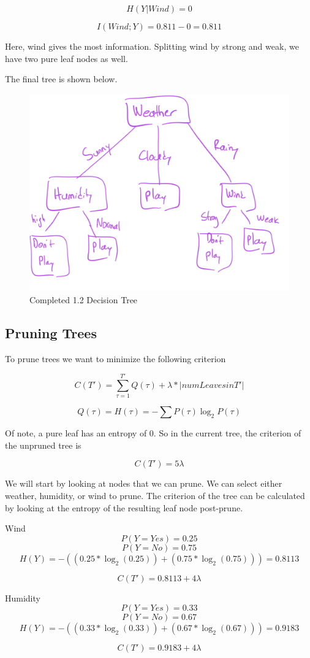 \documentclass{article}
\begin{document}
\[H(Y|Wind) = 0\]

\[I(Wind;Y) = 0.811 - 0 = 0.811\]

Here, wind gives the most information. Splitting wind by strong and weak, we have two pure leaf nodes as well.

The final tree is shown below.

\begin{figure}[H]
    \centering
    \includegraphics[width=0.5\linewidth]{1.2 Tree.png}
    \caption{Completed 1.2 Decision Tree}
\end{figure}


\subsection{Pruning Trees}

To prune trees we want to minimize the following criterion

\[C(T') = \sum_{\tau = 1}^{T'} Q(\tau) + \lambda * | num Leaves in T' |\]

\[Q(\tau) = H(\tau) = - \sum P(\tau)\log_{2}{P(\tau)}\]

Of note, a pure leaf has an entropy of 0. So in the current tree, the criterion of the unpruned tree is

\[C(T') =  5\lambda\]

We will start by looking at nodes that we can prune. We can select either weather, humidity, or wind to prune. The criterion of the tree can be calculated by looking at the entropy of the resulting leaf node post-prune. 

Wind
\[P(Y = Yes) = 0.25\]
\[ P(Y = No) = 0.75\]
\[H(Y) = - ((0.25 * \log_2(0.25)) + (0.75 * \log_2(0.75))) = 0.8113\]

\[C(T') = 0.8113 + 4\lambda \]

Humidity
\[P(Y = Yes) = 0.33\]
\[P(Y = No) = 0.67\]
\[H(Y) = - ((0.33 * \log_2(0.33)) + (0.67 * \log_2(0.67))) = 0.9183\]

\[C(T') = 0.9183 + 4\lambda \]
\end{document}
